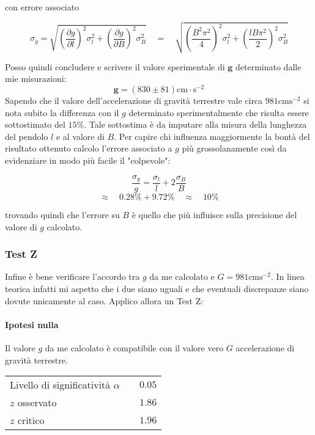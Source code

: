 \documentclass{article}
\begin{document}
	con errore associato
	
	\[
	\sigma_g = \sqrt{\left(\frac{\partial g}{\partial l} \right)^2\sigma_l^2 + \left(\frac{\partial g}{\partial B} \right)^2 \sigma_B^2}  \quad = \quad 	\sqrt{\left(\frac{B^2\pi^2}{4}\right)^2 \sigma_l^2 + \left( \frac{lB\pi^2}{2}  \right)^2 \sigma_B^2}	 
	\]
	
	
	\noindent
	Posso quindi concludere e scrivere il valore sperimentale di $\mathbf{g}$ determinato dalle mie misurazioni:
	\[
	\mathbf{g} = (830 \pm 81)\text{cm}\cdot \text{s}^{-2}
	\]
	\noindent
	Sapendo che il valore dell'accelerazione di gravità terrestre vale circa $981\text{cms}^{-2}$ si nota subito la differenza con il $g$ determinato sperimentalmente che risulta essere sottostimato del $15\%$. Tale sottostima è da imputare alla misura della lunghezza del pendolo $l$ e al valore di $B$.  Per capire chi influenza maggiormente la bontà del risultato ottenuto calcolo l'errore associato a $g$ più grossolanamente così da evidenziare in modo più facile il "colpevole":
	
	\[
	\frac{\sigma_g}{g} = \frac{\sigma_l}{l} + 2\frac{\sigma_B}{B} 
	\]
	\[
	\approx \quad 0.28 \% + 9.72 \% \quad \approx  \quad 10\%	
	\]
	
	trovando quindi che l'errore su $B$ è quello che più influisce sulla precisione del valore di $g$ calcolato.
	\\
	
	\subsubsection{Test Z}
	Infine è bene verificare l'accordo tra $g$ da me calcolato e $G = 981 \text{cms}^{-2}$. In linea teorica infatti mi aspetto che i due siano uguali e che eventuali discrepanze siano dovute unicamente al caso. Applico allora un Test Z:
	
	\paragraph{Ipotesi nulla} Il valore $g$ da me calcolato è compatibile con il valore vero $G$ accelerazione di gravità terrestre.
	
	\vspace{0.7cm}
	\begin{table}[H]
		\centering
		\begin{tabular}{lr}
			Livello di significatività $\alpha$	& $\quad 0.05$  \\
			$z$ osservato             	& $\quad 1.86$  \\
			$z$ critico 		& $\quad 1.96$  \\ 
		\end{tabular}
	\end{table}
	\vspace{0.7cm}
	
\end{document}
